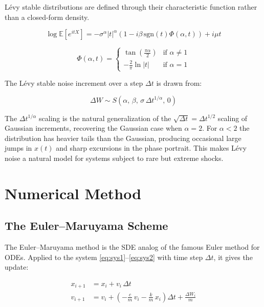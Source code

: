 \documentclass[12pt]{article}
\begin{document}
L\'{e}vy stable distributions are defined through their characteristic function
rather than a closed-form density.

\begin{equation}
    \log \mathbb{E}\!\left[e^{itX}\right] =
    -\sigma^\alpha |t|^\alpha
    \!\left(1 - i\beta\,\mathrm{sgn}(t)\Phi(\alpha, t)\right)
    + i\mu t
    \label{eq:levy_stable}
\end{equation}

\begin{equation}
    \Phi(\alpha, t) = \begin{cases}
        \tan \left(\frac{\pi\alpha}{2}\right) & \text{if } \alpha \ne 1 \\
        -\frac{2}{\pi}\ln|t| & \text{if } \alpha = 1
    \end{cases}
\end{equation}

The L\'{e}vy stable noise increment over a step $\Delta t$ is drawn from:

\begin{equation}
    \Delta W \sim S\!\left(\alpha,\, \beta,\,
    \sigma\,\Delta t^{1/\alpha},\, 0\right)
\end{equation}

The $\Delta t^{1/\alpha}$ scaling is the natural generalization of the
$\sqrt{\Delta t} = \Delta t^{1/2}$ scaling of Gaussian increments, recovering
the Gaussian case when $\alpha = 2$.
For $\alpha < 2$ the distribution has heavier tails than the Gaussian, producing
occasional large jumps in $x(t)$ and sharp excursions in the phase portrait.
This makes L\'{e}vy noise a natural model for systems subject to rare but
extreme shocks.

\section{Numerical Method}

\subsection{The Euler--Maruyama Scheme}

The Euler--Maruyama method is the SDE analog of the famous Euler
method for ODEs. Applied to the system \eqref{eq:sys1}--\eqref{eq:sys2}
with time step $\Delta t$, it gives the update:

\begin{align}
    x_{i+1} &= x_i + v_i\,\Delta t \label{eq:em1} \\
    v_{i+1} &= v_i
              + \left(-\frac{c}{m}\,v_i - \frac{k}{m}\,x_i\right)\!\Delta t
              + \frac{\Delta W_i}{m} \label{eq:em2}
\end{align}
\end{document}
